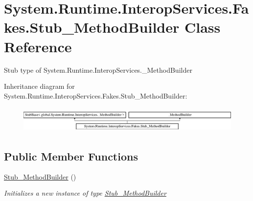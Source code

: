 \hypertarget{class_system_1_1_runtime_1_1_interop_services_1_1_fakes_1_1_stub___method_builder}{\section{System.\-Runtime.\-Interop\-Services.\-Fakes.\-Stub\-\_\-\-Method\-Builder Class Reference}
\label{class_system_1_1_runtime_1_1_interop_services_1_1_fakes_1_1_stub___method_builder}
}


Stub type of System.\-Runtime.\-Interop\-Services.\-\_\-\-Method\-Builder 


Inheritance diagram for System.\-Runtime.\-Interop\-Services.\-Fakes.\-Stub\-\_\-\-Method\-Builder\-:\begin{figure}[H]
\begin{center}
\leavevmode
\includegraphics[height=1.369193cm]{class_system_1_1_runtime_1_1_interop_services_1_1_fakes_1_1_stub___method_builder}
\end{center}
\end{figure}
\subsection*{Public Member Functions}
\begin{DoxyCompactItemize}
\item 
\hyperlink{class_system_1_1_runtime_1_1_interop_services_1_1_fakes_1_1_stub___method_builder_a4d79cf5ed0a71f0f527868727d3af3a6}{Stub\-\_\-\-Method\-Builder} ()
\begin{DoxyCompactList}\small\item\em Initializes a new instance of type \hyperlink{class_system_1_1_runtime_1_1_interop_services_1_1_fakes_1_1_stub___method_builder}{Stub\-\_\-\-Method\-Builder}\end{DoxyCompactList}\end{DoxyCompactItemize}
